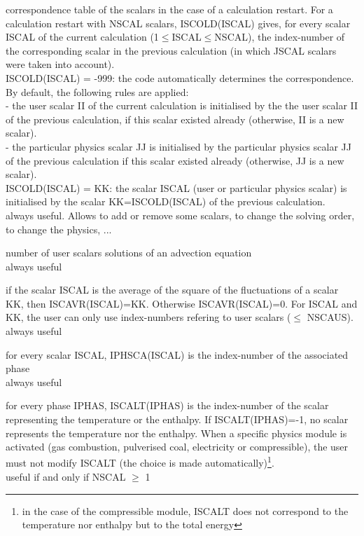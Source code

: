 {correspondence table of the scalars in the case of a calculation
restart. For a calculation restart with NSCAL scalars, ISCOLD(ISCAL)
gives, for every scalar ISCAL of the current calculation
(1$\leqslant$ISCAL$\leqslant$NSCAL), the index-number of the
corresponding scalar in the previous calculation (in which JSCAL scalars were
taken into account).\\
\hspace*{1.3cm} ISCOLD(ISCAL) = -999: the code automatically determines the
correspondence. By default, the following rules are applied:\\
\hspace*{2.cm} - the user scalar II of the current calculation is
initialised by the the user scalar II of the previous calculation, if
this scalar existed already (otherwise, II is a new scalar).\\
\hspace*{2.cm} - the particular physics scalar JJ is initialised by
the particular physics scalar JJ of the previous calculation if this
scalar existed already (otherwise, JJ is a new scalar).\\
\hspace*{1.3cm} ISCOLD(ISCAL) = KK: the scalar ISCAL (user or particular
physics scalar) is initialised by the scalar KK=ISCOLD(ISCAL) of the
previous calculation.\\ 
always useful. Allows to add or remove some scalars, to change the
solving order, to change the physics, ...}

{number of user scalars solutions of an advection equation\\
always useful}

{if the scalar ISCAL is the average of the square of the fluctuations of a
scalar KK, then \mbox{ISCAVR(ISCAL)=KK}.
Otherwise ISCAVR(ISCAL)=0. For ISCAL and KK, the user can only use index-numbers 
refering to user scalars ($\leqslant$ NSCAUS). \\
always useful}

{for every scalar ISCAL, IPHSCA(ISCAL) is the index-number of the
associated phase\\
always useful}

{for every phase IPHAS, ISCALT(IPHAS) is the index-number of the scalar
representing the temperature or the enthalpy. If ISCALT(IPHAS)=-1, no
scalar represents the temperature nor the enthalpy. When a specific
physics module is activated (gas combustion, pulverised coal,
electricity or compressible),
the user must not modify ISCALT (the choice is made
automatically)\footnote{in the case of the compressible module, ISCALT does not
correspond to the temperature nor enthalpy but to the total energy}.\\
useful if and only if NSCAL $\geqslant$ 1}

